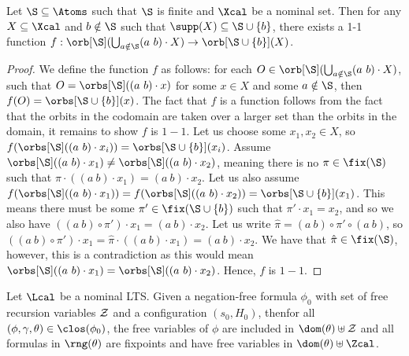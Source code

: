 \begin{lemma}\label{lem:unionOrb3} 
	Let $\S \subseteq \Atoms$ such that $\S$ is finite and $\Xcal$ be a nominal set.
	Then for any $X \subseteq \Xcal$ and $b \notin \S$ such that $\supp(X) \subseteq \S \cup \{b\}$, 
	there exists a 1-1 function 
	$f: \orb[\S](\bigcup_{a \notin \S} (a\ b)\cdot X) \rightarrow \orb[\S \cup \{b\}](X)$.
\end{lemma}
\begin{proof}
	We define the function $f$ as follows: for each $O \in \orb[\S](\bigcup_{a \notin \S} (a\ b)\cdot X)$, such that $O = \orbs[\S]((a\ b) \cdot x)$ for some $x \in X$ and some $a \notin \S$, then $f(O) = \orbs[\S \cup \{b\}](x)$.
	The fact that $f$ is a function follows from the fact that the orbits in the codomain are taken over a larger set than the orbits in the domain, it remains to show $f$ is $1-1$. 
	Let us choose some $x_1, x_2 \in X$, so $f(\orbs[\S]((a\ b) \cdot x_i)) = \orbs[\S \cup \{b\}](x_i)$. 
	Assume $\orbs[\S]((a\ b) \cdot x_1) \neq \orbs[\S]((a\ b)\cdot x_2)$, meaning there is no $\pi \in \fix(\S)$ such that $\pi \cdot ((a\ b)\cdot x_1) = (a\ b)\cdot x_2$.     
	Let us also assume $f(\orbs[\S]((a\ b)\cdot x_1)) = f(\orbs[\S]((a\ b)\cdot x_2)) = \orbs[\S \cup \{b\}](x_1)$. 
	This means there must be some $\pi' \in \fix(\S \cup \{b\})$ such that $\pi' \cdot x_1 = x_2$, and so we also have $((a\ b)\circ \pi') \cdot x_1 = (a\ b) \cdot x_2$.
	Let us write $\hat \pi = (a\ b)\circ \pi' \circ (a\ b)$, so $((a\ b)\circ \pi') \cdot x_1 = \hat \pi \cdot ((a\ b)\cdot x_1) = (a\ b)\cdot x_2$. We have that $\hat \pi \in \fix(\S)$, however, this is a contradiction as this would mean $\orbs[\S]((a\ b) \cdot x_1) = \orbs[\S]((a\ b)\cdot x_2)$. 
	Hence, $f$ is $1-1$.
\end{proof}

\begin{lemma}\label{lem:freshClosProps1}
		Let $\Lcal$ be a nominal LTS.
	Given a negation-free formula $\phi_0$ with set of free recursion variables $\cal Z$ and a configuration $(s_0,H_0)$, thenfor all $(\phi,\gamma,\theta)\in\clos(\phi_0)$, the free variables of $\phi$ are included in $\dom(\theta)\uplus \cal Z$ and all formulas in $\rng(\theta)$ are fixpoints and have free variables in $\dom(\theta)\uplus\Zcal$.
\end{lemma}

